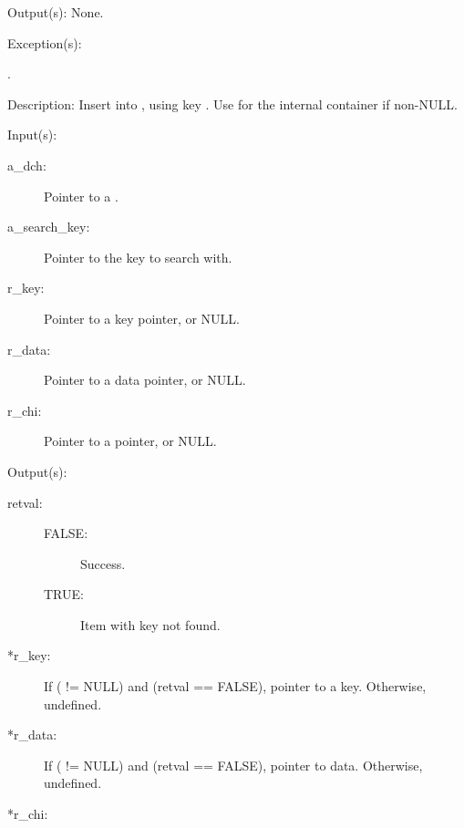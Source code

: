 \begin{capi}
\begin{capilist}
\begin{description}
		\end{description}
	\item[Output(s): ] None.
	\item[Exception(s): ]
		\begin{description}\item[]
		\item[.]
		\end{description}
	\item[Description: ]
		Insert  into , using key
		.  Use  for the internal
		 container if non-NULL.
	\end{capilist}
\label{dch_remove}
	\begin{capilist}
	\item[Input(s): ]
		\begin{description}\item[]
		\item[a\_dch: ]
			Pointer to a .
		\item[a\_search\_key: ]
			Pointer to the key to search with.
		\item[r\_key: ]
			Pointer to a key pointer, or NULL.
		\item[r\_data: ]
			Pointer to a data pointer, or NULL.
		\item[r\_chi: ]
			Pointer to a  pointer, or NULL.
		\end{description}
	\item[Output(s): ]
		\begin{description}\item[]
		\item[retval: ]
			\begin{description}\item[]
			\item[FALSE: ]
				Success.
			\item[TRUE: ]
				Item with key  not	found.
			\end{description}
		\item[*r\_key: ]
			If ( != NULL) and (retval == FALSE),
			pointer to a key.  Otherwise, undefined.
		\item[*r\_data: ]
			If ( != NULL) and (retval == FALSE),
			pointer to data.  Otherwise, undefined.
		\item[*r\_chi: ]

\end{description}
\end{capilist}
\end{capi}
